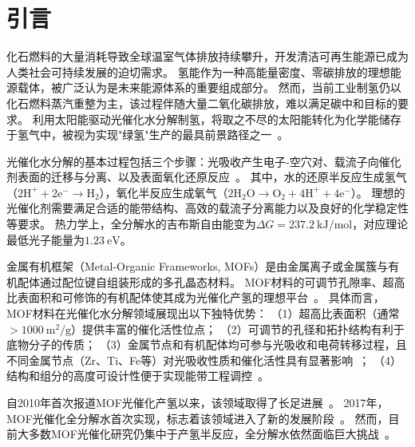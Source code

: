 \section{引言}\label{sec:introduction}


化石燃料的大量消耗导致全球温室气体排放持续攀升，开发清洁可再生能源已成为人类社会可持续发展的迫切需求。 %
氢能作为一种高能量密度、零碳排放的理想能源载体，被广泛认为是未来能源体系的重要组成部分。 %
然而，当前工业制氢仍以化石燃料蒸汽重整为主，该过程伴随大量二氧化碳排放，难以满足碳中和目标的要求。 %
利用太阳能驱动光催化水分解制氢，将取之不尽的太阳能转化为化学能储存于氢气中，被视为实现"绿氢"生产的最具前景路径之一~\citep{hassan2024emerging_trends}。 %


光催化水分解的基本过程包括三个步骤：光吸收产生电子-空穴对、载流子向催化剂表面的迁移与分离、以及表面氧化还原反应~\citep{pmc2024mof_energy_env}。 %
其中，水的还原半反应生成氢气（$2\mathrm{H^+} + 2\mathrm{e^-} \rightarrow \mathrm{H_2}$），氧化半反应生成氧气（$2\mathrm{H_2O} \rightarrow \mathrm{O_2} + 4\mathrm{H^+} + 4\mathrm{e^-}$）。 %
理想的光催化剂需要满足合适的能带结构、高效的载流子分离能力以及良好的化学稳定性等要求。 %
热力学上，全分解水的吉布斯自由能变为$\Delta G = 237.2~\mathrm{kJ/mol}$，对应理论最低光子能量为$1.23~\mathrm{eV}$。 %


金属有机框架（Metal-Organic Frameworks, MOFs）是由金属离子或金属簇与有机配体通过配位键自组装形成的多孔晶态材料。 %
MOF材料的可调节孔隙率、超高比表面积和可修饰的有机配体使其成为光催化产氢的理想平台~\citep{reddy2021mof_h2_advances}。 %
具体而言，MOF材料在光催化水分解领域展现出以下独特优势：
（1）超高比表面积（通常$>1000~\mathrm{m^2/g}$）提供丰富的催化活性位点；
（2）可调节的孔径和拓扑结构有利于底物分子的传质；
（3）金属节点和有机配体均可参与光吸收和电荷转移过程，且不同金属节点（Zr、Ti、Fe等）对光吸收性质和催化活性具有显著影响~\citep{reddy2021mof_h2_advances}；%
（4）结构和组分的高度可设计性便于实现能带工程调控~\citep{chen2023mof_owsp_review}。 %

自2010年首次报道MOF光催化产氢以来，该领域取得了长足进展~\citep{chen2023mof_owsp_review}。 %
2017年，MOF光催化全分解水首次实现，标志着该领域进入了新的发展阶段~\citep{chen2023mof_owsp_review}。 %
然而，目前大多数MOF光催化研究仍集中于产氢半反应，全分解水依然面临巨大挑战~\citep{chen2023mof_owsp_review}。 %

